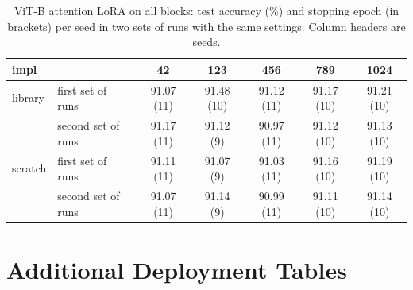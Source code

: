 \begin{table}[H]
\centering\footnotesize
\setlength{\tabcolsep}{3.5pt}
\begin{tabular}{llccccc}
\toprule
impl & & 42 & 123 & 456 & 789 & 1024 \\
\midrule
library & first set of runs & 91.07 (11) & 91.48 (10) & 91.12 (11) & 91.17 (10) & 91.21 (10) \\
        & second set of runs & 91.17 (11) & 91.12 (9)  & 90.97 (11) & 91.12 (10) & 91.13 (10) \\
scratch & first set of runs & 91.11 (11) & 91.07 (9)  & 91.03 (11) & 91.16 (10) & 91.19 (10) \\
        & second set of runs & 91.07 (11) & 91.14 (9)  & 90.99 (11) & 91.11 (10) & 91.14 (10) \\
\bottomrule
\end{tabular}
\caption{ViT-B attention LoRA on all blocks: test accuracy (\%) and stopping epoch (in brackets) per seed in two
sets of runs with the same settings. Column headers are seeds.}
\label{tab:repeat}
\end{table}

\chapter{Additional Deployment Tables}
\label{app:latency}

